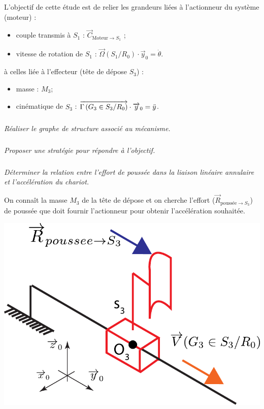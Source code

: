 \documentclass[10pt,fleqn]{article} %
\begin{document}
\begin{multicols}{2}
\begin{multicols}{2}
\begin{obj}
L'objectif de cette étude est de relier les grandeurs liées à l'actionneur du système (moteur) :
\begin{itemize}
\item couple transmis à $S_1$ : $\overrightarrow{C}_{\text{Moteur}\to S_1}$ ;
\item vitesse de rotation de $S_1$ : $\overrightarrow{\Omega}(S_1/R_0)\cdot \overrightarrow{y}_0=\dot{\theta}$.
\end{itemize} 
à celles liée à l'effecteur (tête de dépose $S_3$) : 
\begin{itemize}
\item masse : $M_3$;
\item cinématique de $S_3$ : $\overrightarrow{\Gamma \left( {G_3} \in {S_3}/{R_0}\right)}\cdot \overrightarrow{y}_0=\ddot{y}$.
\end{itemize}
\end{obj}





\subparagraph{}
\textit{Réaliser le graphe de structure associé au mécanisme.}

\subparagraph{}
\textit{Proposer une stratégie pour répondre à l'objectif.}

\subparagraph{}
\textit{Déterminer la relation entre l'effort de poussée dans la liaison linéaire annulaire et l'accélération du chariot.}
\ifprof
\begin{corrige}
On connaît la masse $M_3$ de la tête de dépose et on cherche l'effort ($\overrightarrow{R}_{\text{poussée}\to S_3}$) de poussée que doit fournir l'actionneur pour obtenir l'accélération souhaitée.

\begin{center}
\includegraphics[width=1.0\linewidth]{images/schema_cine_depose_translation.pdf}
\end{center}


\end{corrige}
\end{multicols}
\end{multicols}
\end{document}
